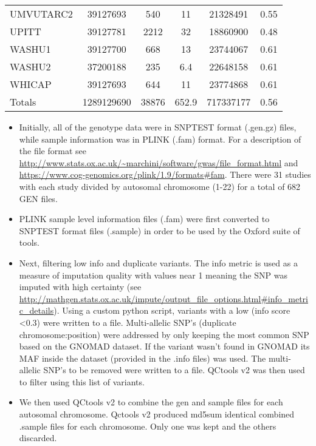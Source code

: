 \documentclass[12pt]{article}
\begin{document}
\begin{table}[H]
\begin{center}
\begin{tabular}{lccccc}
UMVUTARC2 & 39127693 & 540 & 11 & 21328491 & 0.55 \\
UPITT & 39127781 & 2212 & 32 & 18860900 & 0.48 \\
WASHU1 & 39127700 & 668 & 13 & 23744067 & 0.61 \\
WASHU2 & 37200188 & 235 & 6.4 & 22648158 & 0.61 \\
WHICAP & 39127693 & 644 & 11 & 23774868 & 0.61 \\ \hline
Totals & 1289129690 & 38876 & 652.9 & 717337177 & 0.56 \\ \hline
\end{tabular}
\end{center}
\label{table:full}
\end{table}

\begin{itemize}

\item Initially, all of the genotype data were in SNPTEST format (.gen.gz) files, while sample information was in PLINK (.fam) format. For a description of the file format see \url{http://www.stats.ox.ac.uk/~marchini/software/gwas/file_format.html} and \url{https://www.cog-genomics.org/plink/1.9/formats#fam}. There were 31 studies with each study divided by autosomal chromosome (1-22) for a total of 682 GEN files.

\item PLINK sample level information files (.fam) were first converted to SNPTEST format files (.sample) in order to be used by the Oxford suite of tools.

\item Next, filtering low info and duplicate variants. The info metric is used as a measure of imputation quality with values near 1 meaning the SNP was imputed with high certainty (see \url{http://mathgen.stats.ox.ac.uk/impute/output\_file\_options.html\#info\_metric\_details}). Using a custom python script, variants with a low (info score \textless 0.3) were written to a file. Multi-allelic SNP's (duplicate chromosome:position) were addressed by only keeping the most common SNP based on the GNOMAD\cite{lek2016analysis} dataset. If the variant wasn't found in GNOMAD its MAF inside the dataset (provided in the .info files) was used. The multi-allelic SNP's to be removed were written to a file. QCtools v2 was then used to filter using this list of variants.

\item We then used QCtools v2 to combine the gen and sample files for each autosomal chromosome. Qctools v2 produced md5sum identical combined .sample files for each chromosome. Only one was kept and the others discarded.
\end{itemize}
\end{document}
